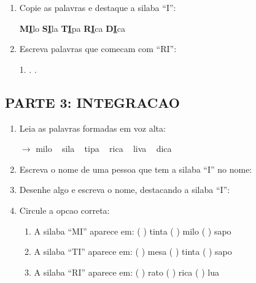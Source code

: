\begin{exercicio}
\begin{enumerate}[resume]
  \item Copie as palavras e destaque a silaba ``I'':
  \begin{center}
  \textbf{M}\underline{\textbf{I}}lo \quad \textbf{S}\underline{\textbf{I}}la \quad \textbf{T}\underline{\textbf{I}}pa \quad \textbf{R}\underline{\textbf{I}}ca \quad \textbf{D}\underline{\textbf{I}}ca
  \end{center}

  \item Escreva palavras que comecam com ``RI'':
  \begin{center}
  1. \underline{\hspace{3cm}} . \underline{\hspace{3cm}} . \underline{\hspace{3cm}}
  \end{center}
\end{enumerate}

\subsection*{PARTE 3: INTEGRACAO}

\begin{enumerate}[resume]
  \item Leia as palavras formadas em voz alta:
  \begin{center}
  $\rightarrow$ milo  ~  sila  ~  tipa  ~  rica  ~  liva  ~  dica
  \end{center}

  \item Escreva o nome de uma pessoa que tem a silaba ``I'' no nome:
  \begin{center}
  \underline{\hspace{6cm}}
  \end{center}

  \item Desenhe algo e escreva o nome, destacando a silaba ``I'':
  \begin{center}
  \end{center}

  \item Circule a opcao correta:
  \begin{enumerate}[label=(\alph*)]
    \item A silaba ``MI'' aparece em: ( ) tinta ( ) milo ( ) sapo
    \item A silaba ``TI'' aparece em: ( ) mesa ( ) tinta ( ) sapo
    \item A silaba ``RI'' aparece em: ( ) rato ( ) rica ( ) lua
  \end{enumerate}


\end{enumerate}
\end{exercicio}
